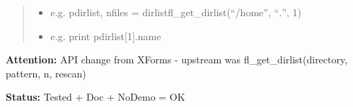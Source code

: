 \begin{boxedminipage}{\funcwidth}
\begin{quote}
\begin{itemize}
  \item
    \setlength{\parskip}{0.6ex}

e.g. pdirlist, nfiles = dirlistfl\_get\_dirlist(``/home'', ``\emph{.}'', 1)


  \item 
e.g. print pdirlist{[}1{]}.name


\end{itemize}

\end{quote}

\textbf{Attention:} 
API change from XForms - upstream was
fl\_get\_dirlist(directory, pattern, n, rescan)


\textbf{Status:} 
Tested + Doc + NoDemo = OK


    \end{boxedminipage}

    \label{xformslib:flfilesys:fl_set_dirlist_filter}

    \vspace{0.5ex}

